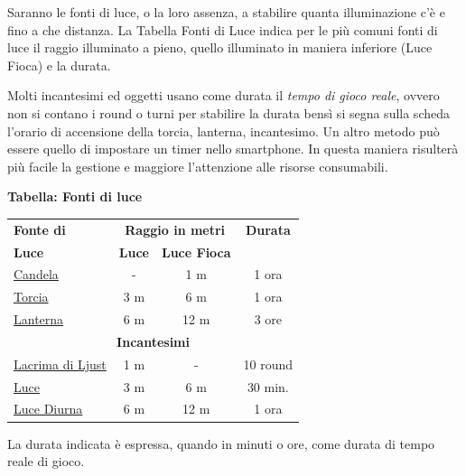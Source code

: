 \begin{multicols}{2}
Saranno le fonti di luce, o la loro assenza, a stabilire quanta illuminazione c'è e fino a che distanza. La Tabella Fonti di Luce indica per le più comuni fonti di luce il raggio illuminato a pieno, quello illuminato in maniera inferiore (Luce Fioca) e la durata.

Molti incantesimi ed oggetti usano come durata il \emph{tempo di gioco reale}, ovvero non si contano i round o turni per stabilire la durata bensì si segna sulla scheda l'orario di accensione della torcia, lanterna, incantesimo. Un altro metodo può essere quello di impostare un timer nello smartphone. In questa maniera risulterà più facile la gestione e maggiore l'attenzione alle risorse consumabili.

\medskip

\textbf{Tabella: Fonti di luce}\label{fontidiluce}

\medskip


\noindent\begin{tabular}{l|cc|c}
\textbf{Fonte di} &\multicolumn{2}{c}{\textbf{Raggio in metri}}& \textbf{Durata} \\
\textbf{Luce}& \textbf{Luce} & \textbf{Luce Fioca} &\\
\toprule
\hyperlink{Candela}{Candela} & - & 1 m & 1 ora\\
\hyperlink{Torcia}{Torcia} & 3 m & 6 m & 1 ora\\
\hyperlink{Lanterna}{Lanterna} & 6 m & 12 m & 3 ore \\
\multicolumn{4}{c}{\textbf{Incantesimi}}\\
\hyperlink{Lacrima di Ljust}{Lacrima di Ljust} & 1 m & - & 10 round\\
\hyperlink{Luce}{Luce}& 3 m & 6 m &30 min. \\
\hyperlink{Luce Diurna}{Luce Diurna} & 6 m & 12 m & 1 ora
\end{tabular}

\smallskip

La durata indicata è espressa, quando in minuti o ore, come durata di tempo reale di gioco.

\medskip


\end{multicols}
